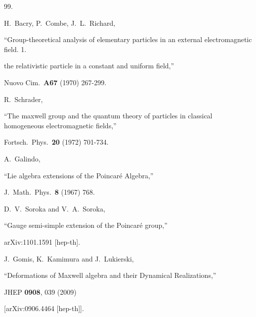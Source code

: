 \documentclass [prd,reprint,eqsecnum,nofootinbib]  {revtex4-1}
\begin{document}
\begin{thebibliography}{99.}





  H.~Bacry, P.~Combe, J.~L.~Richard,

  ``Group-theoretical analysis of elementary particles in an external electromagnetic field. 1.

  the relativistic particle in a constant and uniform field,''

  Nuovo Cim.\  {\bf A67 } (1970)  267-299.





  R.~Schrader,

  ``The maxwell group and the quantum theory of particles in classical homogeneous electromagnetic fields,''

  Fortsch.\ Phys.\  {\bf 20 } (1972)  701-734.





  A.~Galindo,

  ``Lie algebra extensions of the Poincar\'e Algebra,''

  J.\ Math.\ Phys.\  {\bf 8 } (1967)  768.





  D.~V.~Soroka and V.~A.~Soroka,

  ``Gauge semi-simple extension of the Poincar\'e group,''

  arXiv:1101.1591 [hep-th].






  J.~Gomis, K.~Kamimura and J.~Lukierski,

  ``Deformations of Maxwell algebra and their Dynamical Realizations,''

  JHEP {\bf 0908}, 039 (2009)

  [arXiv:0906.4464 [hep-th]].





\end{thebibliography}
\end{document}
